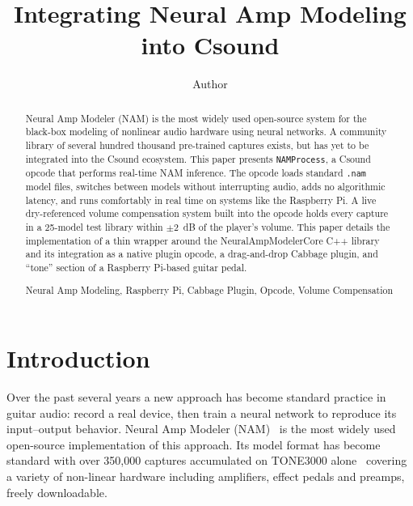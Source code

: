 \documentclass[runningheads,a4paper]{llncs}
\newcommand{\keywords}[1]{\par\addvspace\baselineskip
\noindent\keywordname\enspace\ignorespaces#1}
\begin{document}
\mainmatter

\title{Integrating Neural Amp Modeling into Csound}

\author{Author}

\maketitle

\begin{abstract}
Neural Amp Modeler (NAM) is the most widely used open-source system for
the black-box modeling of nonlinear audio hardware using neural
networks. A community library of several hundred thousand pre-trained
captures exists, but has yet to be integrated into the Csound ecosystem.
This paper presents \texttt{NAMProcess}, a Csound opcode that performs
real-time NAM inference. The opcode loads standard
\texttt{.nam} model files, switches between models without interrupting audio, adds no algorithmic latency, and runs
comfortably in real time on systems like the Raspberry Pi. A live
dry-referenced volume compensation system built into the opcode holds
every capture in a 25-model test library within $\pm
2$~dB of the player's volume. This paper details the implementation of a thin wrapper around
the NeuralAmpModelerCore C++ library and its integration as a native
plugin opcode, a drag-and-drop Cabbage plugin, and ``tone'' section
of a Raspberry Pi-based guitar pedal.
\keywords{Neural Amp Modeling, Raspberry Pi,
Cabbage Plugin, Opcode, Volume Compensation}
\end{abstract}

\section{Introduction}

Over the past several years a new approach has become standard practice in
guitar audio: record a real device, then train a neural network to
reproduce its input--output behavior. Neural Amp Modeler
(NAM)~\cite{atkinson2025slimmable,nam} is the most widely used
open-source implementation of this approach. Its model format has become standard with over 350,000 captures accumulated on TONE3000 alone~\cite{tone3000} covering a variety of non-linear hardware including amplifiers, effect pedals and preamps, freely downloadable.
\end{document}
